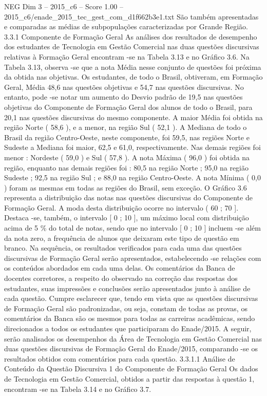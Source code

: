 \begin{textsample}{NEG Dim 3 – 2015\_c6 – Score 1.00 – 2015\_c6/enade\_2015\_tec\_gest\_com\_d1f662b3e1.txt}
São também apresentadas e comparadas as médias de subpopulações caracterizadas por Grande Região. 3.3.1 Componente de Formação Geral As análises dos resultados de desempenho dos estudantes de Tecnologia em Gestão Comercial nas duas questões discursivas relativas à Formação Geral encontram -se na Tabela 3.13 e no Gráfico 3.6.
Na Tabela 3.13, observa -se que a nota Média nesse conjunto de questões foi próxima da obtida nas objetivas.
Os estudantes, de todo o Brasil, obtiveram, em Formação Geral, Média 48,6 nas questões objetivas e 54,7 nas questões discursivas.
No entanto, pode -se notar um aumento do Desvio padrão de 19,5 nas questões objetivas do Componente de Formação Geral dos alunos de todo o Brasil, para 20,1 nas questões discursivas do mesmo componente.
A maior Média foi obtida na região Norte ( 58,6 ), e a menor, na região Sul ( 52,1 ).
A Mediana de todo o Brasil da região Centro-Oeste, neste componente, foi 59,5, nas regiões Norte e Sudeste a Mediana foi maior, 62,5 e 61,0, respectivamente.
Nas demais regiões foi menor : Nordeste ( 59,0 ) e Sul ( 57,8 ).
A nota Máxima ( 96,0 ) foi obtida na região, enquanto nas demais regiões foi : 80,5 na região Norte ; 95,0 na região Sudeste ; 92,5 na região Sul ; e 88,0 na região Centro-Oeste.
A nota Mínima ( 0,0 ) foram as mesmas em todas as regiões do Brasil, sem exceção.
O Gráfico 3.6 representa a distribuição das notas nas questões discursivas do Componente de Formação Geral.
A moda desta distribuição ocorre no intervalo ( 60 ; 70 ].
Destaca -se, também, o intervalo [ 0 ; 10 ], um máximo local com distribuição acima de 5 \% do total de notas, sendo que no intervalo [ 0 ; 10 ] incluem -se além da nota zero, a frequência de alunos que deixaram este tipo de questão em branco.
Na sequência, os resultados verificados para cada uma das questões discursivas de Formação Geral serão apresentados, estabelecendo -se relações com os conteúdos abordados em cada uma delas.
Os comentários da Banca de docentes corretores, a respeito do observado na correção das respostas dos estudantes, suas impressões e conclusões serão apresentados junto à análise de cada questão.
Cumpre esclarecer que, tendo em vista que as questões discursivas de Formação Geral são padronizadas, ou seja, constam de todas as provas, os comentários da Banca são os mesmos para todas as carreiras acadêmicas, sendo direcionados a todos os estudantes que participaram do Enade/2015.
A seguir, serão analisados os desempenhos da Área de Tecnologia em Gestão Comercial nas duas questões discursivas de Formação Geral do Enade/2015, comparando -se os resultados obtidos com comentários para cada questão. 3.3.1.1 Análise de Conteúdo da Questão Discursiva 1 do Componente de Formação Geral Os dados de Tecnologia em Gestão Comercial, obtidos a partir das respostas à questão 1, encontram -se na Tabela 3.14 e no Gráfico 3.7.

\end{textsample}
